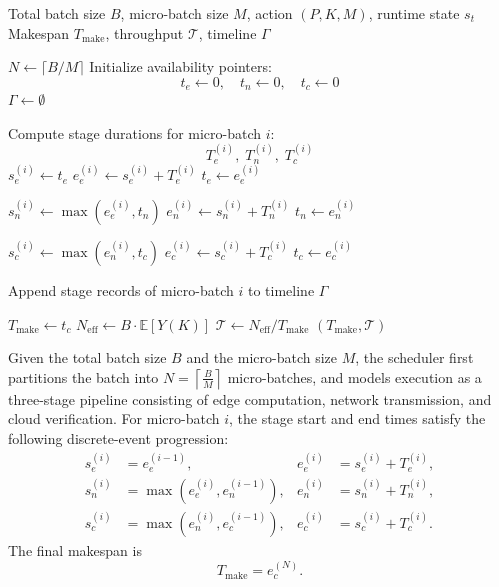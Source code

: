 \documentclass[a4paper,fleqn]{cas-dc}
\begin{document}
\begin{algorithm}[!htbp]
\caption{Phase-Aware micro-batch Pipeline Scheduling}
\label{alg:pipeline_scheduler}
\begin{algorithmic}[1]
\Require Total batch size $B$, micro-batch size $M$, action $(P,K,M)$, runtime state $s_t$
\Ensure Makespan $T_{\mathrm{make}}$, throughput $\mathcal{T}$, timeline $\Gamma$

\State $N \gets \lceil B/M \rceil$
\State Initialize availability pointers:
\[
t_e \gets 0,\quad t_n \gets 0,\quad t_c \gets 0
\]
\State $\Gamma \gets \emptyset$

    \State Compute stage durations for micro-batch $i$:
    \[
    T_e^{(i)},\; T_n^{(i)},\; T_c^{(i)}
    \]
    \State $s_e^{(i)} \gets t_e$
    \State $e_e^{(i)} \gets s_e^{(i)} + T_e^{(i)}$
    \State $t_e \gets e_e^{(i)}$

    \State $s_n^{(i)} \gets \max(e_e^{(i)}, t_n)$
    \State $e_n^{(i)} \gets s_n^{(i)} + T_n^{(i)}$
    \State $t_n \gets e_n^{(i)}$

    \State $s_c^{(i)} \gets \max(e_n^{(i)}, t_c)$
    \State $e_c^{(i)} \gets s_c^{(i)} + T_c^{(i)}$
    \State $t_c \gets e_c^{(i)}$

    \State Append stage records of micro-batch $i$ to timeline $\Gamma$
\EndFor

\State $T_{\mathrm{make}} \gets t_c$
\State $N_{\mathrm{eff}} \gets B \cdot \mathbb{E}[Y(K)]$
\State $\mathcal{T} \gets N_{\mathrm{eff}} / T_{\mathrm{make}}$
\State \Return $(T_{\mathrm{make}}, \mathcal{T})$
\end{algorithmic}
\end{algorithm}

Given the total batch size $B$ and the micro-batch size $M$, the scheduler first partitions the batch into
$N = \left\lceil \frac{B}{M} \right\rceil$
micro-batches, and models execution as a three-stage pipeline consisting of edge computation, network transmission, and cloud verification. For micro-batch $i$, the stage start and end times satisfy the following discrete-event progression:
\begin{align}
s_e^{(i)} &= e_e^{(i-1)}, &
e_e^{(i)} &= s_e^{(i)} + T_e^{(i)}, \\
s_n^{(i)} &= \max\!\left(e_e^{(i)}, e_n^{(i-1)}\right), &
e_n^{(i)} &= s_n^{(i)} + T_n^{(i)}, \\
s_c^{(i)} &= \max\!\left(e_n^{(i)}, e_c^{(i-1)}\right), &
e_c^{(i)} &= s_c^{(i)} + T_c^{(i)}.
\end{align}
The final makespan is
\begin{equation}
T_{\text{make}} = e_c^{(N)}.
\end{equation}
\end{document}
